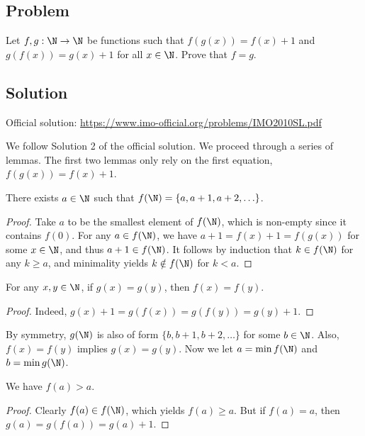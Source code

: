 \subsection*{Problem}

Let $f, g : \N \to \N$ be functions such that $f(g(x)) = f(x) + 1$ and $g(f(x)) = g(x) + 1$ for all $x \in \N$.
Prove that $f = g$.



\subsection*{Solution}

Official solution: \url{https://www.imo-official.org/problems/IMO2010SL.pdf}

We follow Solution 2 of the official solution.
We proceed through a series of lemmas.
The first two lemmas only rely on the first equation, $f(g(x)) = f(x) + 1$.

\begin{lemma}\label{2010a6-1}
There exists $a \in \N$ such that $f(\N) = \{a, a + 1, a + 2, \ldots\}$.
\end{lemma}
\begin{proof}
Take $a$ to be the smallest element of $f(\N)$, which is non-empty since it contains $f(0)$.
For any $a \in f(\N)$, we have $a + 1 = f(x) + 1 = f(g(x))$ for some $x \in \N$, and thus $a + 1 \in f(\N)$.
It follows by induction that $k \in f(\N)$ for any $k \geq a$, and minimality yields $k \notin f(\N)$ for $k < a$.
\end{proof}

\begin{lemma}\label{2010a6-2}
For any $x, y \in \N$, if $g(x) = g(y)$, then $f(x) = f(y)$.
\end{lemma}
\begin{proof}
Indeed, $g(x) + 1 = g(f(x)) = g(f(y)) = g(y) + 1$.
\end{proof}

By symmetry, $g(\N)$ is also of form $\{b, b + 1, b + 2, \ldots\}$ for some $b \in \N$.
Also, $f(x) = f(y)$ implies $g(x) = g(y)$.
Now we let $a = \min f(\N)$ and $b = \min g(\N)$.

\begin{lemma}\label{2010a6-3}
We have $f(a) > a$.
\end{lemma}
\begin{proof}
Clearly $f(a) \in f(\N)$, which yields $f(a) \geq a$.
But if $f(a) = a$, then $g(a) = g(f(a)) = g(a) + 1$.
\end{proof}

